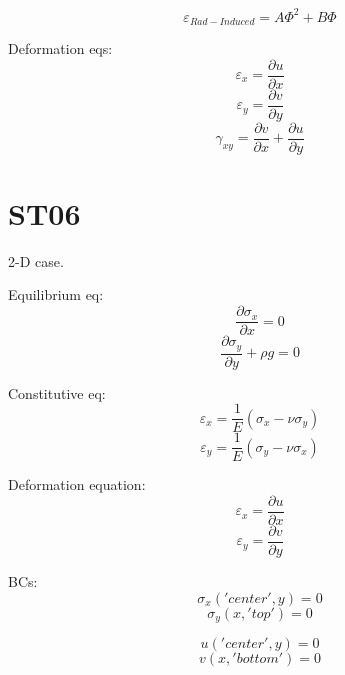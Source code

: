 \documentclass[11pt,letterpaper]{article}
\begin{document}
\begin{equation}
\varepsilon_{Rad-Induced} = A \Phi^2 + B \Phi
\end{equation}

Deformation eqs:
\begin{equation}
\varepsilon_x = \frac{\partial u}{\partial x}
\end{equation}
\begin{equation}
\varepsilon_y = \frac{\partial v}{\partial y}
\end{equation}
\begin{equation}
\gamma_{xy} = \frac{\partial v}{\partial x} + \frac{\partial u}{\partial y}
\end{equation}

\section{ST06}

2-D case.

Equilibrium eq:
\begin{equation}
\frac{\partial \sigma_x}{\partial x} = 0
\end{equation}
\begin{equation}
\frac{\partial \sigma_y}{\partial y} + \rho g = 0
\end{equation}

Constitutive eq:
\begin{equation}
\varepsilon_x = \frac{1}{E} (\sigma_x - \nu \sigma_y)
\end{equation}
\begin{equation}
\varepsilon_y = \frac{1}{E} (\sigma_y - \nu \sigma_x)
\end{equation}

Deformation equation:
\begin{equation}
\varepsilon_x = \frac{\partial u}{\partial x}
\end{equation}
\begin{equation}
\varepsilon_y = \frac{\partial v}{\partial y}
\end{equation}

BCs:
\begin{equation}
\sigma_x ('center', y) = 0
\end{equation}
\begin{equation}
\sigma_y (x, 'top') = 0
\end{equation}

\begin{equation}
u ('center', y) = 0
\end{equation}
\begin{equation}
v (x, 'bottom') = 0
\end{equation}
\end{document}
